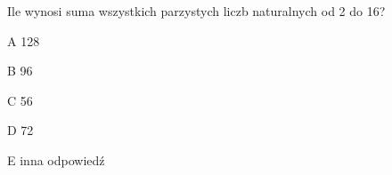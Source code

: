 \begin{tresc}
Ile wynosi suma wszystkich parzystych liczb naturalnych od 2 do 16?
\end{tresc}
\begin{wariant}{A} 128 \end{wariant}
\begin{wariant}{B} 96 \end{wariant}
\begin{wariant}{C} 56 \end{wariant}
\begin{wariant}{D} 72 \end{wariant}
\begin{wariant}{E} inna odpowiedź \end{wariant}
